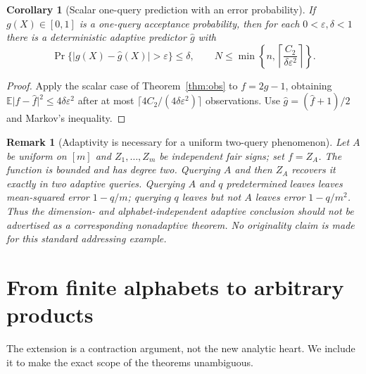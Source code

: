 \documentclass[11pt,letterpaper]{article}
\newtheorem{corollary}[theorem]{Corollary}
\newtheorem{remark}[theorem]{Remark}
\theoremstyle{definition}\newtheorem{definition}[theorem]{Definition}
\newcommand{\E}{\mathbb E}
\newcommand{\Ctwo}{C_2}
\newcommand{\abs}[1]{\lvert #1\rvert}
\begin{document}
\begin{corollary}[Scalar one-query prediction with an error probability]\label{cor:scalarq}
If $g(X)\in[0,1]$ is a one-query acceptance probability, then for each $0<\varepsilon,\delta<1$ there is a deterministic adaptive predictor $\widehat g$ with
\[
\Pr\{\abs{g(X)-\widehat g(X)}>\varepsilon\}\le\delta,
\qquad N\le\min\left\{n,\left\lceil\frac{\Ctwo}{\delta\varepsilon^2}\right\rceil\right\}.
\]
\end{corollary}
\begin{proof}
Apply the scalar case of Theorem~\ref{thm:obs} to $f=2g-1$, obtaining $\E\abs{f-\widehat f}^2\le4\delta\varepsilon^2$ after at most $\lceil4\Ctwo/(4\delta\varepsilon^2)\rceil$ observations. Use $\widehat g=(\widehat f+1)/2$ and Markov's inequality.
\end{proof}

\begin{remark}[Adaptivity is necessary for a uniform two-query phenomenon]
Let $A$ be uniform on $[m]$ and $Z_1,\ldots,Z_m$ be independent fair signs; set $f=Z_A$. The function is bounded and has degree two. Querying $A$ and then $Z_A$ recovers it exactly in two adaptive queries. Querying $A$ and $q$ \emph{predetermined} leaves leaves mean-squared error $1-q/m$; querying $q$ leaves but not $A$ leaves error $1-q/m^2$. Thus the dimension- and alphabet-independent adaptive conclusion should not be advertised as a corresponding nonadaptive theorem. No originality claim is made for this standard addressing example.
\end{remark}

\section{From finite alphabets to arbitrary products}\label{sec:lift}
The extension is a contraction argument, not the new analytic heart. We include it to make the exact scope of the theorems unambiguous.
\end{document}
